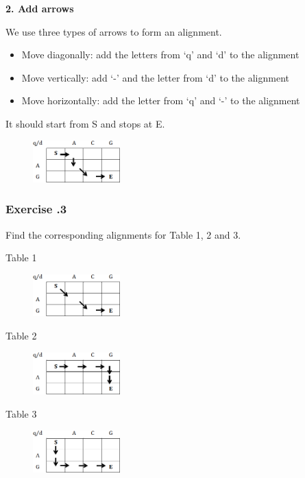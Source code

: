 \noindent \textbf{2. Add arrows}

We use three types of arrows to form an alignment.
\begin{itemize}
\item Move diagonally: add the letters from ‘q’ and ‘d’ to the alignment
\item Move vertically: add ‘-’ and the letter from ‘d’ to the alignment
\item Move horizontally: add the letter from ‘q’ and ‘-’ to the alignment
\end{itemize}

It should start from S and stops at E.

\begin{figure}[H]
  \centering
      \includegraphics[width=0.3\textwidth]{fig02/alignment_to_table_example.png}
\end{figure}

%
%
\subsubsection*{Exercise \thesection.3}

Find the corresponding alignments for Table 1, 2 and 3.

\begin{multicols}{3}
Table 1
\begin{figure}[H]
  \centering
      \includegraphics[width=0.3\textwidth]{fig02/alignment_to_table_exercise_1.png}
\end{figure}

Table 2
\begin{figure}[H]
  \centering
      \includegraphics[width=0.3\textwidth]{fig02/alignment_to_table_exercise_2.png}
\end{figure}

Table 3
\begin{figure}[H]
  \centering
      \includegraphics[width=0.3\textwidth]{fig02/alignment_to_table_exercise_3.png}
\end{figure}

\end{multicols} 

%
